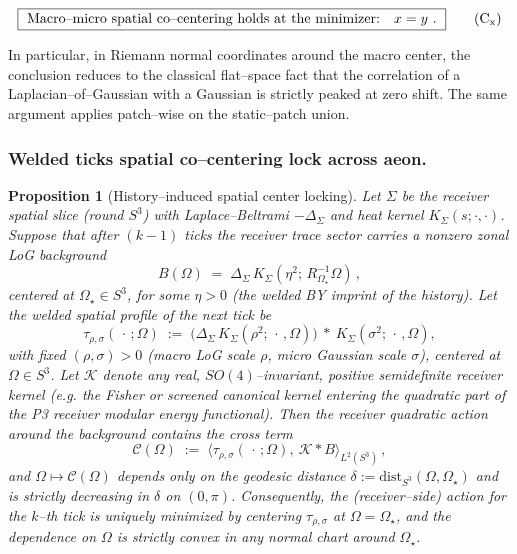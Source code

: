 \documentclass[10pt]{article}
\theoremstyle{definition}
\theoremstyle{plain}
\newtheorem{proposition}{Proposition}[section]
\begin{document}
\begin{equation}
\boxed{\ \text{Macro--micro spatial co--centering holds at the minimizer:}\quad x=y\ .\ }
\tag{C\textsubscript{x}}\label{eq:Cx}
\end{equation}

\noindent
In particular, in Riemann normal coordinates around the macro center, the conclusion reduces to the
classical flat–space fact that the correlation of a Laplacian–of–Gaussian with a Gaussian is strictly
peaked at zero shift. The same argument applies patch–wise on the static–patch union.

\subsubsection*{Welded ticks spatial co–centering lock across aeon.}
\label{subsubsec:welded-co-centering}

\begin{proposition}[History--induced spatial center locking]
\label{prop:history-center-lock}
Let $\Sigma$ be the receiver spatial slice (round $S^3$) with Laplace--Beltrami $-\Delta_\Sigma$
and heat kernel $K_\Sigma(s;\cdot,\cdot)$. Suppose that after $(k-1)$ ticks the receiver trace sector
carries a nonzero \emph{zonal LoG background}
\[
B(\Omega)\;=\;\Delta_\Sigma\,K_\Sigma(\eta^2;\,R_{\Omega_\star}^{-1}\Omega)\,,
\]
centered at $\Omega_\star\in S^3$, for some $\eta>0$ (the welded BY imprint of the history).
Let the welded spatial profile of the next tick be
\[
\tau_{\rho,\sigma}(\,\cdot\,;\Omega)\;:=\;\big(\Delta_\Sigma\,K_\Sigma(\rho^2;\,\cdot\, ,\Omega)\big)\ \ast\ K_\Sigma(\sigma^2;\,\cdot\,,\Omega),
\]
with fixed $(\rho,\sigma)>0$ (macro LoG scale $\rho$, micro Gaussian scale $\sigma$), centered at $\Omega\in S^3$.
Let $\mathcal K$ denote any real, $SO(4)$--invariant, positive semidefinite receiver kernel (e.g. the Fisher
or screened canonical kernel entering the quadratic part of the P3 receiver modular energy functional). Then the receiver
quadratic action around the background contains the cross term
\[
\mathcal C(\Omega)\;:=\;\big\langle \tau_{\rho,\sigma}(\,\cdot\,;\Omega),\ \mathcal K * B\big\rangle_{L^2(S^3)}\,,
\]
and $\Omega\mapsto \mathcal C(\Omega)$ depends only on the geodesic distance $\delta:=\mathrm{dist}_{S^3}(\Omega,\Omega_\star)$
and is \emph{strictly decreasing} in $\delta$ on $(0,\pi)$. Consequently, the (receiver--side) action for the $k$--th tick
is \emph{uniquely} minimized by centering $\tau_{\rho,\sigma}$ at $\Omega=\Omega_\star$, and the dependence on $\Omega$ is
strictly convex in any normal chart around $\Omega_\star$.
\end{proposition}
\end{document}
